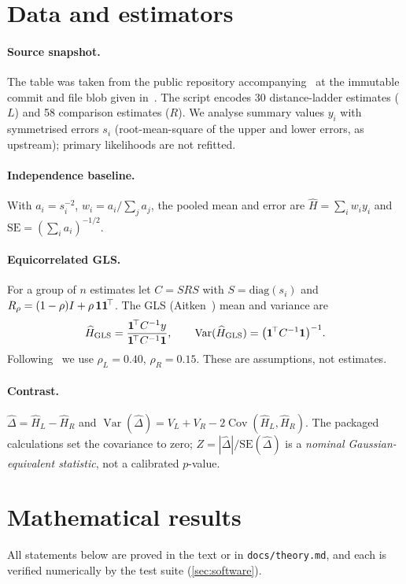 \documentclass[11pt,a4paper]{article}
\theoremstyle{remark}\newtheorem{remark}{Remark}
\DeclareMathOperator{\Var}{Var}\DeclareMathOperator{\Cov}{Cov}\DeclareMathOperator{\Corr}{Corr}
\begin{document}
\section{Data and estimators}\label{sec:data}
\paragraph{Source snapshot.} The table was taken from the public repository accompanying~\cite{PantosPerivolaropoulos2026} at the immutable commit and file blob given in~\cite{PantosRepo}. The script encodes 30 distance-ladder estimates ($L$) and 58 comparison estimates ($R$). We analyse summary values $y_i$ with symmetrised errors $s_i$ (root-mean-square of the upper and lower errors, as upstream); primary likelihoods are not refitted.

\paragraph{Independence baseline.} With $a_i=s_i^{-2}$, $w_i=a_i/\sum_ja_j$, the pooled mean and error are $\widehat H=\sum_iw_iy_i$ and $\mathrm{SE}=(\sum_ia_i)^{-1/2}$.

\paragraph{Equicorrelated GLS.} For a group of $n$ estimates let $C=SRS$ with $S=\mathrm{diag}(s_i)$ and $R_\rho=(1-\rho)I+\rho\,\bm{1}\bm{1}^{\!\top}$. The GLS (Aitken~\cite{Aitken1935}) mean and variance are
\begin{equation}
\widehat H_{\rm GLS}=\frac{\one^{\!\top}C^{-1}y}{\one^{\!\top}C^{-1}\one},\qquad \Var(\widehat H_{\rm GLS})=\bigl(\one^{\!\top}C^{-1}\one\bigr)^{-1}.
\end{equation}
Following~\cite{PantosPerivolaropoulos2026} we use $\rho_L=0.40$, $\rho_R=0.15$. These are assumptions, not estimates.

\paragraph{Contrast.} $\widehat\Delta=\widehat H_L-\widehat H_R$ and $\Var(\widehat\Delta)=V_L+V_R-2\Cov(\widehat H_L,\widehat H_R)$. The packaged calculations set the covariance to zero; $Z=|\widehat\Delta|/\mathrm{SE}(\widehat\Delta)$ is a \emph{nominal Gaussian-equivalent statistic}, not a calibrated $p$-value.

\section{Mathematical results}\label{sec:theory}
All statements below are proved in the text or in \texttt{docs/theory.md}, and each is verified numerically by the test suite (\cref{sec:software}).
\end{document}
